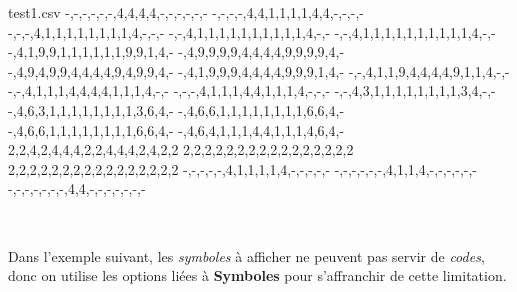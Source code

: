 \documentclass{article}
\newcommand\Cle[1]{{\bfseries\sffamily\textlangle #1\textrangle}}
\begin{document}
\begin{PresentationCode}{}
\begin{filecontents*}[overwrite]{test1.csv}
	-,-,-,-,-,-,4,4,4,4,-,-,-,-,-,-
	-,-,-,-,4,4,1,1,1,1,4,4,-,-,-,-
	-,-,-,4,1,1,1,1,1,1,1,1,4,-,-,-
	-,-,4,1,1,1,1,1,1,1,1,1,1,4,-,-
	-,-,4,1,1,1,1,1,1,1,1,1,1,4,-,-
	-,4,1,9,9,1,1,1,1,1,1,9,9,1,4,-
	-,4,9,9,9,9,4,4,4,4,9,9,9,9,4,-
	-,4,9,4,9,9,4,4,4,4,9,4,9,9,4,-
	-,4,1,9,9,9,4,4,4,4,9,9,9,1,4,-
	-,-,4,1,1,9,4,4,4,4,9,1,1,4,-,-
	-,-,4,1,1,1,4,4,4,4,1,1,1,4,-,-
	-,-,-,4,1,1,1,4,4,1,1,1,4,-,-,-
	-,-,4,3,1,1,1,1,1,1,1,1,3,4,-,-
	-,4,6,3,1,1,1,1,1,1,1,1,3,6,4,-
	-,4,6,6,1,1,1,1,1,1,1,1,6,6,4,-
	-,4,6,6,1,1,1,1,1,1,1,1,6,6,4,-
	-,4,6,4,1,1,1,4,4,1,1,1,4,6,4,-
	2,2,4,2,4,4,4,2,2,4,4,4,2,4,2,2
	2,2,2,2,2,2,2,2,2,2,2,2,2,2,2,2
	2,2,2,2,2,2,2,2,2,2,2,2,2,2,2,2
	-,-,-,-,-,4,1,1,1,1,4,-,-,-,-,-
	-,-,-,-,-,-,4,1,1,4,-,-,-,-,-,-
	-,-,-,-,-,-,-,4,4,-,-,-,-,-,-,-
\end{filecontents*}
\end{PresentationCode}

\begin{PresentationCode}{}
~~
~~
\end{PresentationCode}

\pagebreak

Dans l'exemple suivant, les \textit{symboles} à afficher ne peuvent pas servir de \textit{codes}, donc on utilise les options liées à \Cle{Symboles} pour s'affranchir de cette limitation.
\end{document}
